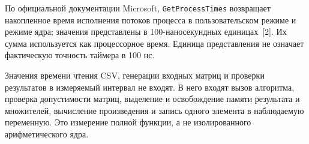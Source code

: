 \documentclass[14pt,a4paper]{extarticle}
\numberwithin{equation}{section}
\begin{document}
По официальной документации Microsoft, \texttt{GetProcessTimes} возвращает накопленное время исполнения потоков процесса в пользовательском режиме и режиме ядра; значения представлены в 100-наносекундных единицах~[2]. Их сумма используется как процессорное время. Единица представления не означает фактическую точность таймера в 100 нс.

Значения времени чтения CSV, генерации входных матриц и проверки результатов в измеряемый интервал не входят. В него входят вызов алгоритма, проверка допустимости матриц, выделение и освобождение памяти результата и множителей, вычисление произведения и запись одного элемента в наблюдаемую переменную. Это измерение полной функции, а не изолированного арифметического ядра.
\end{document}
